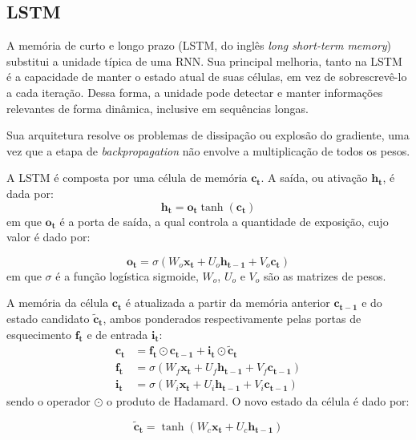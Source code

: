 \subsection{LSTM}
A memória de curto e longo prazo (LSTM, do inglês \textit{long short-term
memory}) \cite{chung2014empirical} substitui a unidade típica de uma RNN. Sua
principal melhoria, tanto na LSTM é a capacidade de manter o estado atual
de suas células, em vez de sobrescrevê-lo a cada iteração. Dessa forma, a
unidade pode detectar e manter informações relevantes de forma dinâmica,
inclusive em sequências longas.

Sua arquitetura resolve os problemas de dissipação ou explosão do
gradiente, uma vez que a etapa de \textit{backpropagation} não envolve a
multiplicação de todos os pesos.

A LSTM é composta por uma célula de memória $\mathbf{c_t}$. A saída, ou ativação
$\mathbf{h_t}$, é dada por:
\begin{equation}
    \mathbf{h_t} = \mathbf{o_t}\tanh(\mathbf{c_t})
\end{equation}
em que $\mathbf{o_t}$ é a porta de saída, a qual controla a quantidade de
exposição, cujo valor é dado por:

\begin{equation}
    \mathbf{o_t} = \sigma(W_o\mathbf{x_t} + U_o\mathbf{h_{t-1}} + V_o\mathbf{c_t})
\end{equation}
em que $\sigma$ é a função logística sigmoide, $W_o$, $U_o$ e $V_o$ são as
matrizes de pesos.

A memória da célula $\mathbf{c_t}$ é atualizada a partir da memória anterior
$\mathbf{c_{t-1}}$ e do estado candidato $\mathbf{\tilde{c}_t}$, ambos ponderados
respectivamente pelas portas de esquecimento $\mathbf{f_t}$ e de entrada $\mathbf{i_t}$:
\begin{align}
    \mathbf{c_t} &= \mathbf{f_t} \odot \mathbf{c_{t-1}} + \mathbf{i_t} \odot \mathbf{\tilde{c}_t} \\
    \mathbf{f_t} &= \sigma(W_f\mathbf{x_t} + U_f\mathbf{h_{t-1}} + V_f\mathbf{c_{t-1}}) \\
    \mathbf{i_t} &= \sigma(W_i\mathbf{x_t} + U_i\mathbf{h_{t-1}} + V_i\mathbf{c_{t-1}})
\end{align}
sendo o operador $\odot$ o produto
de Hadamard. O novo estado da célula é dado por:

\begin{equation}
    \mathbf{\tilde{c}_t} = \tanh(W_c\mathbf{x_t} + U_c\mathbf{h_{t-1}})
\end{equation}


